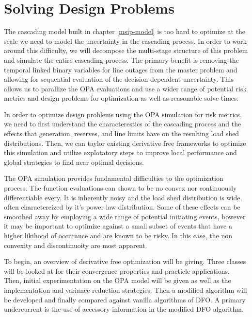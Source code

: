 \newcommand{\mypathdfo}{../thesis/dfo}
\newcommand{\mypathdfodata}{../thesis/dfo/data}
\newcommand{\scd}{\cD_\oplus}
\newcommand{\btu}{\bigtriangleup}
\chapter{Solving Design Problems}

The cascading model built in chapter \ref{msip-model} is too hard to optimize at the scale we need to model the uncertainty in the cascading process.  In order to work around this difficulty, we will decompose the multi-stage structure of this problem and simulate the entire cascading process.  The primary benefit is removing the temporal linked binary variables for line outages from the master problem and allowing for sequential evaluation of the decision dependent uncertainty.  This allows us to parallize the OPA evaluations and use a wider range of potential risk metrics and design problems for optimization as well as reasonable solve times.

In order to optimize design problems using the OPA simulation for risk metrics, we need to first understand the characterestics of the cascading process and the effects that generation, reserves, and line limits have on the resulting load shed distributions.  Then, we can taylor existing derivative free frameworks to optimize this simulation and utilize explotatory steps to improve local performance and global strategies to find near optimal decisions.

The OPA simulation provides fundamental difficulties to the optimization process.  The function evaluations can shown to be no convex nor continuously differentiable every.  It is inherently noisy and the load shed distribution is wide, often charactereized by it's power law distribution.  Some of these effects can be smoothed away by employing a wide range of potential initiating events, however it may be important to optimize against a small subset of events that have a higher likihood of occurance and are known to be risky.  In this case, the non convexity and discontinuoity are most apparent.

To begin, an overview of derivative free optimization will be giving.  Three classes will be looked at for their convergence properties and practicle applications.  Then, initial experimentation on the OPA model will be given as well as the implementation and variance reduction strategies.  Then a modified algorithm will be developed and finally compared against vanilla algorithms of DFO.  A primary undercurrent is the use of accessory information in the modified DFO algorithm.

